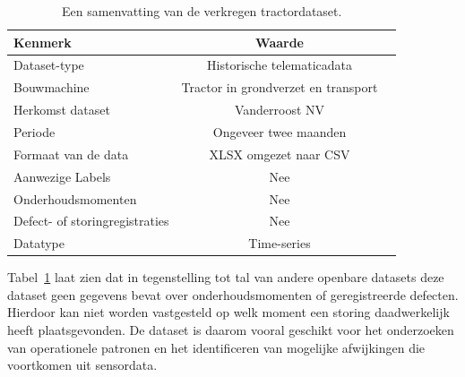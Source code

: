 
\begin{table}[H]
\centering
\begin{tabular}{lcr}
 \toprule
\textbf{Kenmerk} & \textbf{Waarde}  \\
 \midrule
Dataset-type                & Historische telematicadata                         \\
Bouwmachine                & Tractor in grondverzet en transport                          \\
Herkomst dataset                & Vanderroost NV                         \\
Periode & Ongeveer twee maanden \\
Formaat van de data & XLSX omgezet naar CSV \\
Aanwezige Labels & Nee \\
Onderhoudsmomenten & Nee \\
Defect- of storingregistraties & Nee \\
Datatype & Time-series \\
 \bottomrule
\end{tabular}
\caption[Tabel: overzicht tractordataset]{\label{tab:tabel overzicht tractordataset}Een samenvatting van de verkregen tractordataset.}
\end{table}

Tabel~\ref{tab:tabel overzicht tractordataset} laat zien dat in tegenstelling tot tal van andere openbare datasets deze dataset geen gegevens bevat over onderhoudsmomenten of geregistreerde defecten. Hierdoor kan niet worden vastgesteld op welk moment een storing daadwerkelijk heeft plaatsgevonden. De dataset is daarom vooral geschikt voor het onderzoeken van operationele patronen en het identificeren van mogelijke afwijkingen die voortkomen uit sensordata.

